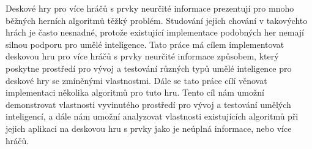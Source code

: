 \documentclass[12pt]{report}
\begin{document}

Deskové hry pro více hráčů s prvky neurčité informace prezentují pro mnoho
běžných herních algoritmů těžký problém. Studování jejich chování v takovýchto hrách
je často nesnadné, protože existující implementace podobných her nemají silnou
podporu pro umělé inteligence. Tato práce má cílem implementovat deskovou hru
pro více hráčů s prvky neurčité informace způsobem, který poskytne prostředí
pro vývoj a testování různých typů umělé inteligence pro deskové hry
se zmíněnými vlastnostmi. Dále se tato práce cílí věnovat implementaci
několika algoritmů pro tuto hru. Tento cíl nám umožní demonstrovat
vlastnosti vyvinutého prostředí pro vývoj a testování umělých inteligencí,
a dále nám umožní analyzovat vlastnosti existujících algoritmů
při jejich aplikaci na deskovou hru s prvky jako je neúplná informace, nebo
více hráčů.
\end{document}
